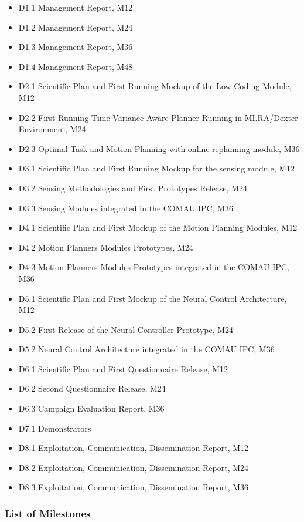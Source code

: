 \begin{itemize}
\item
  D1.1 Management Report, M12
\item
  D1.2 Management Report, M24
\item
  D1.3 Management Report, M36
\item
  D1.4 Management Report, M48
\item
  D2.1 Scientific Plan and First Running Mockup of the Low-Coding
  Module, M12
\item
  D2.2 First Running Time-Variance Aware Planner Running in MI.RA/Dexter
  Environment, M24
\item
  D2.3 Optimal Task and Motion Planning with online replanning module,
  M36
\item
  D3.1 Scientific Plan and First Running Mockup for the sensing module,
  M12
\item
  D3.2 Sensing Methodologies and First Prototypes Release, M24
\item
  D3.3 Sensing Modules integrated in the COMAU IPC, M36
\item
  D4.1 Scientific Plan and First Mockup of the Motion Planning Modules,
  M12
\item
  D4.2 Motion Planners Modules Prototypes, M24
\item
  D4.3 Motion Planners Modules Prototypes integrated in the COMAU IPC,
  M36
\item
  D5.1 Scientific Plan and First Mockup of the Neural Control
  Architecture, M12
\item
  D5.2 First Release of the Neural Controller Prototype, M24
\item
  D5.2 Neural Control Architecture integrated in the COMAU IPC, M36
\item
  D6.1 Scientific Plan and First Questionnaire Release, M12
\item
  D6.2 Second Questionnaire Release, M24
\item
  D6.3 Campaign Evaluation Report, M36
\item
  D7.1 Demonstrators
\item
  D8.1 Exploitation, Communication, Dissemination Report, M12
\item
  D8.2 Exploitation, Communication, Dissemination Report, M24
\item
  D8.3 Exploitation, Communication, Dissemination Report, M36
\end{itemize}

\subsubsection{List of Milestones}\label{list-of-milestones}

